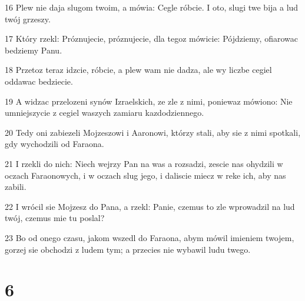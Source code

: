 \par 16 Plew nie daja slugom twoim, a mówia: Cegle róbcie. I oto, slugi twe bija a lud twój grzeszy.
\par 17 Który rzekl: Próznujecie, próznujecie, dla tegoz mówicie: Pójdziemy, ofiarowac bedziemy Panu.
\par 18 Przetoz teraz idzcie, róbcie, a plew wam nie dadza, ale wy liczbe cegiel oddawac bedziecie.
\par 19 A widzac przelozeni synów Izraelskich, ze zle z nimi, poniewaz mówiono: Nie umniejszycie z cegiel waszych zamiaru kazdodziennego.
\par 20 Tedy oni zabiezeli Mojzeszowi i Aaronowi, którzy stali, aby sie z nimi spotkali, gdy wychodzili od Faraona.
\par 21 I rzekli do nich: Niech wejrzy Pan na was a rozsadzi, zescie nas ohydzili w oczach Faraonowych, i w oczach slug jego, i daliscie miecz w reke ich, aby nas zabili.
\par 22 I wrócil sie Mojzesz do Pana, a rzekl: Panie, czemus to zle wprowadzil na lud twój, czemus mie tu poslal?
\par 23 Bo od onego czasu, jakom wszedl do Faraona, abym mówil imieniem twojem, gorzej sie obchodzi z ludem tym; a przecies nie wybawil ludu twego.

\chapter{6}

